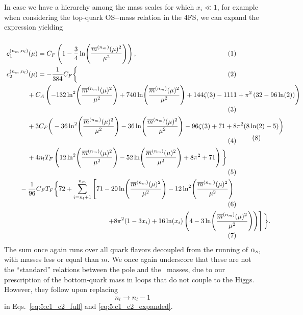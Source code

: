 In case we have a hierarchy among the mass scales for which $x_i \ll 1$, for example when considering the top-quark \acs{OS}-\MS-mass relation in the 4\acs{FS}, we can expand the expression yielding
\begin{equation}
\resizebox{\textwidth}{!}{
\begin{minipage}{\textwidth}
\begin{align*}
c_1^{(n_m, n_l)}(&\mu) = C_F \left(1 -\frac{3}{4} \ln\! \left(\frac{\overline{m}^{(n_m)}(\mu)^2}{\mu^2} \right) \right), \\
c_2^{(n_m, n_l)}(&\mu) = -\frac{1}{384} C_F \bigg \lbrace \\
&\hspace{-0.2cm} + C_A \left(-132 \ln^2\!\left(\frac{\overline{m}^{(n_m)}(\mu)^2}{\mu^2} \right) +740 \ln\! \left(\frac{\overline{m}^{(n_m)}(\mu)^2}{\mu^2} \right) +144 \zeta (3)-1111+\pi ^2 \left( 32-96 \ln (2) \right) \right) \\
& \hspace{-0.2cm} +3 C_F \bigg(-36 \ln^2\! \left(\frac{\overline{m}^{(n_m)}(\mu)^2}{\mu^2} \right) -36 \ln\! \left(\frac{\overline{m}^{(n_m)}(\mu)^2}{\mu^2} \right) -96 \zeta (3)+71+8 \pi ^2 (8 \ln (2)-5)\bigg) \\
& \hspace{-0.2cm} +4 n_l T_F\left(12 \ln^2\! \left( \frac{\overline{m}^{(n_m)}(\mu)^2}{\mu^2} \right) -52 \ln\! \left( \frac{\overline{m}^{(n_m)}(\mu)^2}{\mu^2} \right) +8 \pi ^2+71\right) \bigg \rbrace \\
& \hspace{-0.6cm}   - \frac{1}{96} C_F T_F \bigg \lbrace 72  +  \sum_{i = n_l + 1}^{n_m}  \left[71 - 20 \ln\! \left( \frac{\overline{m}^{(n_m)}(\mu)^2}{\mu^2} \right) - 12 \ln^2\! \left( \frac{\overline{m}^{(n_m)}(\mu)^2}{\mu^2} \right) \right. \\
&\hspace{4cm} \left. + 8 \pi^2 (1 - 3 x_i) + 16 \ln (x_i) \left(4 - 3 \ln\! \left( \frac{\overline{m}^{(n_m)}(\mu)^2}{\mu^2} \right) \right) \right] \bigg \rbrace.
\end{align*}
\end{minipage}
}
\refstepcounter{equation}
\tag{\theequation} \label{eq:5:c1_c2_expanded}
\end{equation}
The sum once again runs over all quark flavors decoupled from the running of $\alpha_s$, with masses less or equal than $m$. We once again underscore that these are not the ``standard'' relations between the pole and the \MS\ masses, due to our prescription of the bottom-quark mass in loops that do not couple to the Higgs. However, they follow upon replacing
\begin{equation}
n_l \longrightarrow n_l - 1
\end{equation}
in Eqs.~\eqref{eq:5:c1_c2_full} and \eqref{eq:5:c1_c2_expanded}.


